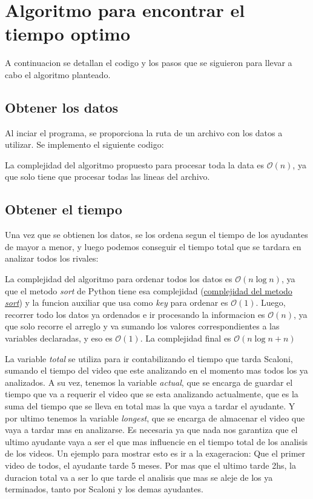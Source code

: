 \section{Algoritmo para encontrar el tiempo optimo}

A continuacion se detallan el codigo y los pasos que se siguieron para llevar a cabo el algoritmo planteado.

\subsection{Obtener los datos}

Al inciar el programa, se proporciona la ruta de un archivo con los datos a utilizar. Se implemento el siguiente codigo:



La complejidad del algoritmo propuesto para procesar toda la data es $\mathcal{O}(n)$, ya que solo tiene que procesar todas las lineas del archivo.

\subsection{Obtener el tiempo}

Una vez que se obtienen los datos, se los ordena segun el tiempo de los ayudantes de mayor a menor, y luego podemos conseguir el tiempo total que se tardara en analizar todos los rivales:



La complejidad del algoritmo para ordenar todos los datos es $\mathcal{O}\left(n \log n\right)$, ya que el metodo \textit{sort} de Python tiene esa complejidad (\href{https://www.geeksforgeeks.org/sort-in-python/}{complejidad del metodo \textit{sort}}) y la funcion auxiliar que usa como \textit{key} para ordenar es $\mathcal{O}(1)$. Luego, recorrer todo los datos ya ordenados e ir procesando la informacion es $\mathcal{O}(n)$, ya que solo recorre el arreglo y va sumando los valores correspondientes a las variables declaradas, y eso es $\mathcal{O}(1)$. La complejidad final es $\mathcal{O}\left(n \log n + n\right)$

La variable \textit{total} se utiliza para ir contabilizando el tiempo que tarda Scaloni, sumando el tiempo del video que este analizando en el momento mas todos los ya analizados. A su vez, tenemos la variable \textit{actual}, que se encarga de guardar el tiempo que va a requerir el video que se esta analizando actualmente, que es la suma del tiempo que se lleva en total mas la que vaya a tardar el ayudante. Y por ultimo tenemos la variable \textit{longest}, que se encarga de almacenar el video que vaya a tardar mas en analizarse. Es necesaria ya que nada nos garantiza que el ultimo ayudante vaya a ser el que mas influencie en el tiempo total de los analisis de los videos. Un ejemplo para mostrar esto es ir a la exageracion: Que el primer video de todos, el ayudante tarde 5 meses. Por mas que el ultimo tarde 2hs, la duracion total va a ser lo que tarde el analisis que mas se aleje de los ya terminados, tanto por Scaloni y los demas ayudantes.